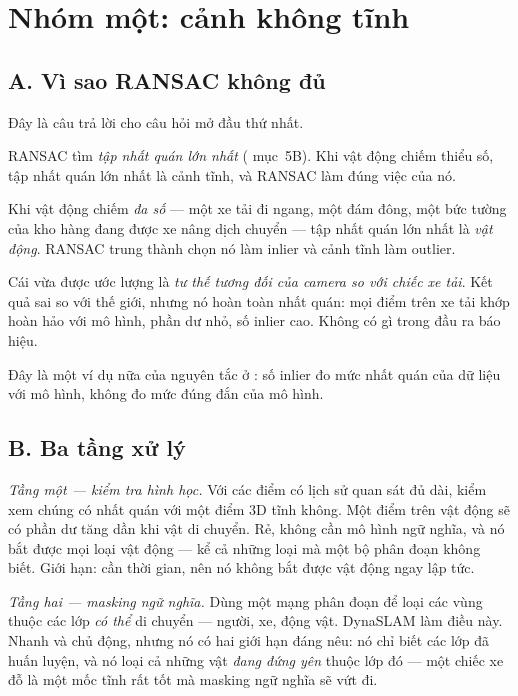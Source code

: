 \documentclass[../../vslam.tex]{subfiles}
\begin{document}
\section{Nhóm một: cảnh không tĩnh}

\subsection{A. Vì sao RANSAC không đủ}

Đây là câu trả lời cho câu hỏi mở đầu thứ nhất.

RANSAC tìm \emph{tập nhất quán lớn nhất} ( mục~5B). Khi vật động chiếm thiểu số, tập nhất quán lớn nhất là cảnh tĩnh, và RANSAC làm đúng việc của nó.

Khi vật động chiếm \emph{đa số} --- một xe tải đi ngang, một đám đông, một bức tường của kho hàng đang được xe nâng dịch chuyển --- tập nhất quán lớn nhất là \emph{vật động}. RANSAC trung thành chọn nó làm inlier và cảnh tĩnh làm outlier.

Cái vừa được ước lượng là \emph{tư thế tương đối của camera so với chiếc xe tải}. Kết quả sai so với thế giới, nhưng nó hoàn toàn nhất quán: mọi điểm trên xe tải khớp hoàn hảo với mô hình, phần dư nhỏ, số inlier cao. Không có gì trong đầu ra báo hiệu.

Đây là một ví dụ nữa của nguyên tắc ở : số inlier đo mức nhất quán của dữ liệu với mô hình, không đo mức đúng đắn của mô hình.

\subsection{B. Ba tầng xử lý}

\emph{Tầng một --- kiểm tra hình học.} Với các điểm có lịch sử quan sát đủ dài, kiểm xem chúng có nhất quán với một điểm \(3\)D tĩnh không. Một điểm trên vật động sẽ có phần dư tăng dần khi vật di chuyển. Rẻ, không cần mô hình ngữ nghĩa, và nó bắt được mọi loại vật động --- kể cả những loại mà một bộ phân đoạn không biết. Giới hạn: cần thời gian, nên nó không bắt được vật động ngay lập tức.

\emph{Tầng hai --- masking ngữ nghĩa.} Dùng một mạng phân đoạn để loại các vùng thuộc các lớp \emph{có thể} di chuyển --- người, xe, động vật. DynaSLAM \cite{bescos2018dynaslam} làm điều này. Nhanh và chủ động, nhưng nó có hai giới hạn đáng nêu: nó chỉ biết các lớp đã huấn luyện, và nó loại cả những vật \emph{đang đứng yên} thuộc lớp đó --- một chiếc xe đỗ là một mốc tĩnh rất tốt mà masking ngữ nghĩa sẽ vứt đi.
\end{document}
